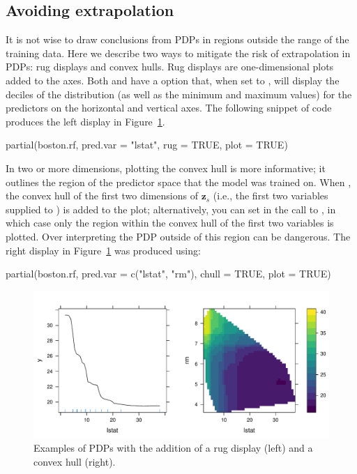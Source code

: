 \subsection{Avoiding extrapolation}

It is not wise to draw conclusions from PDPs in regions outside the range of the training data. Here we describe two ways to mitigate the risk of extrapolation in PDPs: rug displays and convex hulls. Rug displays are one-dimensional plots added to the axes. Both  and  have a  option that, when set to , will display the deciles of the distribution (as well as the minimum and maximum values) for the predictors on the horizontal and vertical axes. The following snippet of code produces the left display in Figure~\ref{fig:partial_extrap}.
\begin{example}
partial(boston.rf, pred.var = "lstat", rug = TRUE, plot = TRUE)
\end{example}

In two or more dimensions, plotting the convex hull is more informative; it outlines the region of the predictor space that the model was trained on. When , the convex hull of the first two dimensions of $\boldsymbol{z}_s$ (i.e., the first two variables supplied to ) is added to the plot; alternatively, you can set  in the call to , in which case only the region within the convex hull of the first two variables is plotted. Over interpreting the PDP outside of this region can be dangerous. The right display in Figure~\ref{fig:partial_extrap} was produced using:
\begin{example}
partial(boston.rf, pred.var = c("lstat", "rm"), chull = TRUE, plot = TRUE)
\end{example}

\begin{figure}[htbp]
  \centering
  \includegraphics[width=1.0\linewidth]{partial_extrap}
  \caption{Examples of PDPs with the addition of a rug display (left) and a convex hull (right).}
  \label{fig:partial_extrap}
\end{figure}


